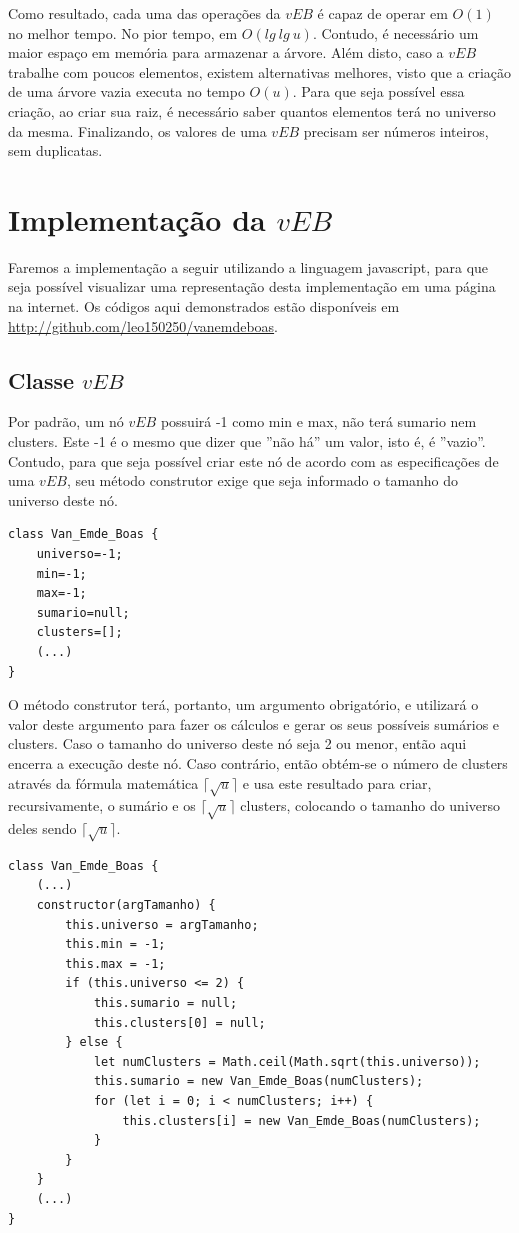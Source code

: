\documentclass[12pt]{article}
\begin{document}
Como resultado, cada uma das operações da $vEB$ é capaz de operar em $O(1)$ no melhor tempo. No pior tempo, em $O(lg\ lg\ u)$. Contudo, é necessário um maior espaço em memória para armazenar a árvore. Além disto, caso a $vEB$ trabalhe com poucos elementos, existem alternativas melhores, visto que a criação de uma árvore vazia executa no tempo $O(u)$. Para que seja possível essa criação, ao criar sua raiz, é necessário saber quantos elementos terá no universo da mesma. Finalizando, os valores de uma $vEB$ precisam ser números inteiros, sem duplicatas.

\section{Implementação da $vEB$}

Faremos a implementação a seguir utilizando a linguagem javascript, para que seja possível visualizar uma representação desta implementação em uma página na internet. Os códigos aqui demonstrados estão disponíveis em \url{http://github.com/leo150250/vanemdeboas}.

\subsection{Classe $vEB$}
Por padrão, um nó $vEB$ possuirá -1 como min e max, não terá sumario nem clusters. Este -1 é o mesmo que dizer que ''não há'' um valor, isto é, é ''vazio''. Contudo, para que seja possível criar este nó de acordo com as especificações de uma $vEB$, seu método construtor exige que seja informado o tamanho do universo deste nó.
\begin{verbatim}
class Van_Emde_Boas {
    universo=-1;
    min=-1;
    max=-1;
    sumario=null;
    clusters=[];
    (...)
}
\end{verbatim}
O método construtor terá, portanto, um argumento obrigatório, e utilizará o valor deste argumento para fazer os cálculos e gerar os seus possíveis sumários e clusters. Caso o tamanho do universo deste nó seja 2 ou menor, então aqui encerra a execução deste nó. Caso contrário, então obtém-se o número de clusters através da fórmula matemática $\lceil \sqrt{u} \rceil$ e usa este resultado para criar, recursivamente, o sumário e os $\lceil \sqrt{u} \rceil$ clusters, colocando o tamanho do universo deles sendo $\lceil \sqrt{u} \rceil$.
\begin{verbatim}
class Van_Emde_Boas {
    (...)
    constructor(argTamanho) {
        this.universo = argTamanho;
        this.min = -1;
        this.max = -1;
        if (this.universo <= 2) {
            this.sumario = null;
            this.clusters[0] = null;
        } else {
            let numClusters = Math.ceil(Math.sqrt(this.universo));
            this.sumario = new Van_Emde_Boas(numClusters);
            for (let i = 0; i < numClusters; i++) {
                this.clusters[i] = new Van_Emde_Boas(numClusters);
            }
        }
    }
    (...)
}
\end{verbatim}
\end{document}
